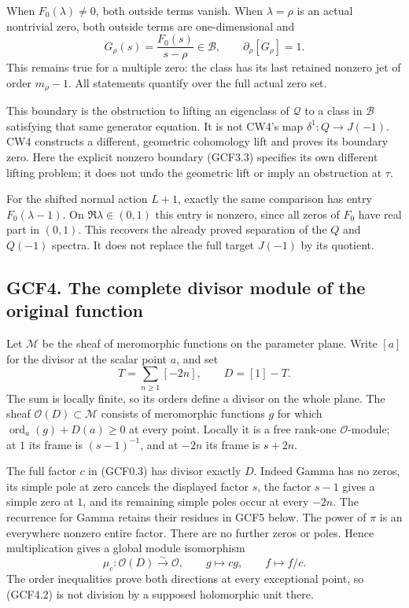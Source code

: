 When \(F_0(\lambda)\ne0\), both outside terms vanish. When
\(\lambda=\rho\) is an actual nontrivial zero, both outside terms are
one-dimensional and \[
G_\rho(s)=\frac{F_0(s)}{s-\rho}\in\mathcal B,
\qquad \partial_\rho[G_\rho]=1.
\tag{GCF3.3}
\] This remains true for a multiple zero: the class has its last
retained nonzero jet of order \(m_\rho-1\). All statements quantify over
the full actual zero set.

This boundary is the obstruction to lifting an eigenclass of
\(\mathcal Q\) to a class in \(\mathcal B\) satisfying that same
generator equation. It is not CW4's map \(\delta^1:Q\to J(-1)\). CW4
constructs a different, geometric cohomology lift and proves its
boundary zero. Here the explicit nonzero boundary (GCF3.3) specifies its
own different lifting problem; it does not undo the geometric lift or
imply an obstruction at \(\tau\).

For the shifted normal action \(L+1\), exactly the same comparison has
entry \(F_0(\lambda-1)\). On \(\Re\lambda\in(0,1)\) this entry is
nonzero, since all zeros of \(F_0\) have real part in \((0,1)\). This
recovers the already proved separation of the \(Q\) and \(Q(-1)\)
spectra. It does not replace the full target \(J(-1)\) by its quotient.

\subsection{GCF4. The complete divisor module of the original
function}\label{gcf4.-the-complete-divisor-module-of-the-original-function}

Let \(\mathcal M\) be the sheaf of meromorphic functions on the
parameter plane. Write \([a]\) for the divisor at the scalar point
\(a\), and set \[
T=\sum_{n\ge1}[-2n],\qquad D=[1]-T.
\tag{GCF4.1}
\] The sum is locally finite, so its orders define a divisor on the
whole plane. The sheaf \(\mathcal O(D)\subset\mathcal M\) consists of
meromorphic functions \(g\) for which
\(\operatorname{ord}_a(g)+D(a)\ge0\) at every point. Locally it is a
free rank-one \(\mathcal O\)-module; at \(1\) its frame is
\((s-1)^{-1}\), and at \(-2n\) its frame is \(s+2n\).

The full factor \(c\) in (GCF0.3) has divisor exactly \(D\). Indeed
Gamma has no zeros, its simple pole at zero cancels the displayed factor
\(s\), the factor \(s-1\) gives a simple zero at \(1\), and its
remaining simple poles occur at every \(-2n\). The recurrence for Gamma
retains their residues in GCF5 below. The power of \(\pi\) is an
everywhere nonzero entire factor. There are no further zeros or poles.
Hence multiplication gives a global module isomorphism \[
\mu_c:\mathcal O(D)\xrightarrow{\sim}\mathcal O,
\qquad g\longmapsto cg,
\qquad f\longmapsto f/c.
\tag{GCF4.2}
\] The order inequalities prove both directions at every exceptional
point, so (GCF4.2) is not division by a supposed holomorphic unit there.

